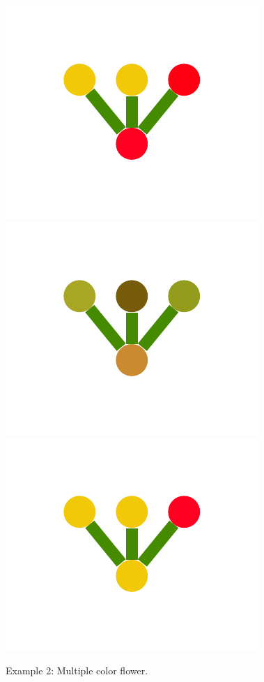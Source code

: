 \documentclass[a4paper,10pt]{article}
\begin{document}
\begin{figure}
{    \includegraphics[scale=.2]{./figures/6-2-multiple-color-flower-induced-6.pdf}
    \includegraphics[scale=.2]{./figures/6-2-multiple-color-flower-induced-7.pdf}
    \includegraphics[scale=.2]{./figures/6-2-multiple-color-flower-induced-8.pdf}
    \label{fig:exp-multiple-flower-induced}    
    }
  \caption{Example 2: Multiple color flower.}
  \label{fig:exp-multiple-flower}
\end{figure}
\end{document}
